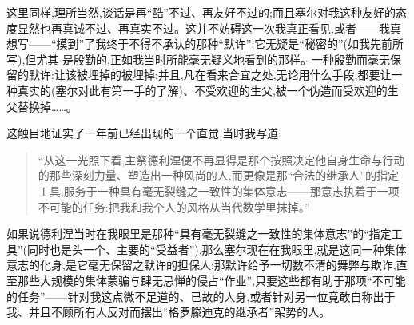 这里同样,理所当然,谈话是再“酷”不过、再友好不过的;而且塞尔对我这种友好的态度显然也再真诚不过、再真实不过。这并不妨碍这一次我真正看见,或者——我真想写——“摸到”了我终于不得不承认的那种“默许”;它无疑是“秘密的”(如我先前所写),但尤其
是殷勤的,正如我当时所能毫无疑义地看到的那样。一种殷勤而毫无保留的默许:让该被埋掉的被埋掉;并且,凡在看来合宜之处,无论用什么手段,都要让一种真实的(塞尔对此有第一手的了解)、不受欢迎的生父,被一个伪造而受欢迎的生父替换掉……。

\pmark 这触目地证实了一年前已经出现的一个直觉,当时我写道:

\begin{quote}
“从这一光照下看,主祭德利涅便不再显得是那个按照决定他自身生命与行动的那些深刻力量、塑造出一种风尚的人,而更像是那“合法的继承人”的指定工具,服务于一种具有毫无裂缝之一致性的集体意志——那意志执着于一项不可能的任务:把我和我个人的风格从当代数学里抹掉。”
\end{quote}

如果说德利涅当时在我眼里是那种“具有毫无裂缝之一致性的集体意志”的“指定工具”(同时也是头一个、主要的“受益者”),那么塞尔现在在我眼里,就是这同一种集体意志的化身,是它毫无保留之默许的担保人;那默许给予一切数不清的舞弊与欺诈,直至那些大规模的集体蒙骗与肆无忌惮的侵占“作业”,只要这些都有助于那项“不可能的任务”——针对我这点微不足道的、已故的人身,或者针对另一位竟敢自称出于我、并且不顾所有人反对而摆出“格罗滕迪克的继承者”架势的人。

